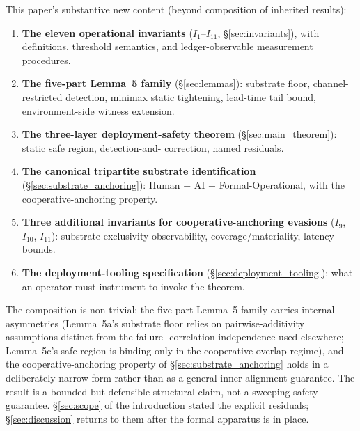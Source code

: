 This paper's substantive new content (beyond composition of
inherited results):
\begin{enumerate}
\item \textbf{The eleven operational invariants}
  ($I_1$--$I_{11}$, \S\ref{sec:invariants}), with definitions,
  threshold semantics, and ledger-observable measurement procedures.
\item \textbf{The five-part Lemma~5 family} (\S\ref{sec:lemmas}):
  substrate floor, channel-restricted detection, minimax static
  tightening, lead-time tail bound, environment-side witness
  extension.
\item \textbf{The three-layer deployment-safety theorem}
  (\S\ref{sec:main_theorem}): static safe region, detection-and-
  correction, named residuals.
\item \textbf{The canonical tripartite substrate identification}
  (\S\ref{sec:substrate_anchoring}): Human + AI +
  Formal-Operational, with the cooperative-anchoring property.
\item \textbf{Three additional invariants for cooperative-anchoring
  evasions} ($I_9$, $I_{10}$, $I_{11}$): substrate-exclusivity
  observability, coverage/materiality, latency bounds.
\item \textbf{The deployment-tooling specification}
  (\S\ref{sec:deployment_tooling}): what an operator must
  instrument to invoke the theorem.
\end{enumerate}

The composition is non-trivial: the five-part Lemma~5 family
carries internal asymmetries (Lemma~5a's substrate floor relies on
pairwise-additivity assumptions distinct from the failure-
correlation independence used elsewhere; Lemma~5c's safe region is
binding only in the cooperative-overlap regime), and the
cooperative-anchoring property of \S\ref{sec:substrate_anchoring}
holds in a deliberately narrow form rather than as a general
inner-alignment guarantee.  The result is a bounded but defensible
structural claim, not a sweeping safety guarantee.
\S\ref{sec:scope} of the introduction stated the explicit residuals;
\S\ref{sec:discussion} returns to them after the formal apparatus
is in place.
